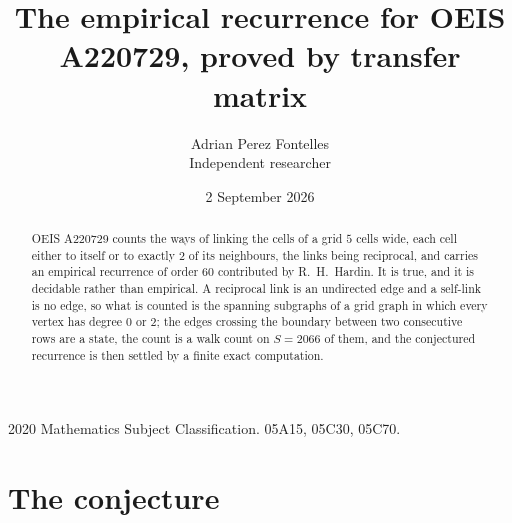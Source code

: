 \documentclass[11pt,a4paper]{article}
\title{The empirical recurrence for OEIS A220729, proved by transfer matrix}
\author{Adrian Perez Fontelles\\ \small Independent researcher}
\date{2 September 2026}
\theoremstyle{plain}
\theoremstyle{definition}
\begin{document}
\maketitle

\begin{abstract}
OEIS A220729 counts the ways of linking the cells of a grid $5$ cells wide, each cell either to
itself or to exactly $2$ of its neighbours, the links being reciprocal, and carries an
empirical recurrence of order $60$ contributed by R.~H.~Hardin. It is true, and it is
decidable rather than empirical. A reciprocal link is an undirected edge and a self-link is
no edge, so what is counted is the spanning subgraphs of a grid graph in which every vertex
has degree $0$ or $2$; the edges crossing the boundary between two consecutive rows are a
state, the count is a walk count on $S=2066$ of them, and the conjectured recurrence is then
settled by a finite exact computation.
\end{abstract}

\noindent\small 2020 Mathematics Subject Classification. 05A15, 05C30, 05C70.\normalsize

\section{The conjecture}
\end{document}
